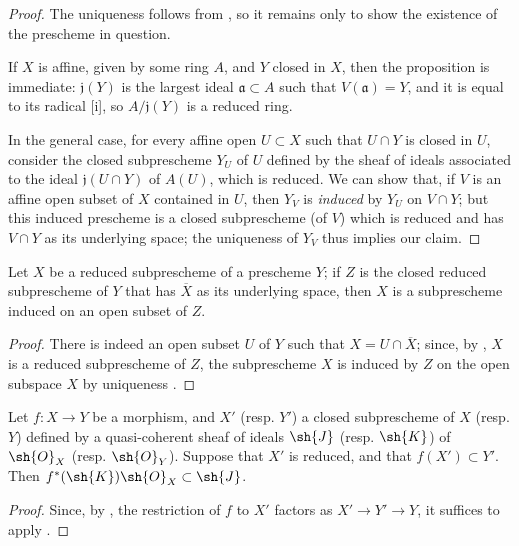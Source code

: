 \begin{proof}
The uniqueness follows from , so it remains only to show the existence of the prescheme in question.

If $X$ is affine, given by some ring $A$, and $Y$ closed in $X$, then the proposition is immediate:
$\mathfrak{j}(Y)$ is the largest ideal $\mathfrak{a}\subset A$ such that $V(\mathfrak{a})=Y$, and it is equal to its radical [i], so $A/\mathfrak{j}(Y)$ is a reduced ring.

In the general case, for every affine open $U\subset X$ such that $U\cap Y$ is closed in $U$, consider the closed subprescheme $Y_U$ of $U$ defined by the sheaf of ideals associated to the ideal $\mathfrak{j}(U\cap Y)$ of $A(U)$, which is reduced.
We can show that, if $V$ is an affine open subset of $X$ contained in $U$, then $Y_V$ is \emph{induced} by $Y_U$ on $V\cap Y$;
but this induced prescheme is a closed subprescheme (of $V$) which is reduced and has $V\cap Y$ as its underlying space;
the uniqueness of $Y_V$ thus implies our claim.
\end{proof}

\begin{proposition}[5.2.2]
\label{I.5.2.2}
Let $X$ be a reduced subprescheme of a prescheme $Y$; if $Z$ is the closed reduced subprescheme of $Y$ that has $\overline{X}$ as its underlying space, then $X$ is a subprescheme induced on an open subset of $Z$.
\end{proposition}

\begin{proof}
There is indeed an open subset $U$ of $Y$ such that $X=U\cap\overline{X}$;
since, by , $X$ is a reduced subprescheme of $Z$, the subprescheme $X$ is induced by $Z$ on the open subspace $X$ by uniqueness .
\end{proof}

\begin{corollary}[5.2.4]
\label{I.5.2.4}
Let $f:X\to Y$ be a morphism, and $X'$ (resp. $Y'$) a closed subprescheme of $X$ (resp. $Y$) defined by a quasi-coherent sheaf of ideals $\sh{J}$ (resp. $\sh{K}$) of $\sh{O}_X$ (resp. $\sh{O}_Y$).
Suppose that $X'$ is reduced, and that $f(X')\subset Y'$.
Then $f^*(\sh{K})\sh{O}_X\subset\sh{J}$.
\end{corollary}

\begin{proof}
Since, by , the restriction of $f$ to $X'$ factors as $X'\to Y'\to Y$, it suffices to apply .
\end{proof}

